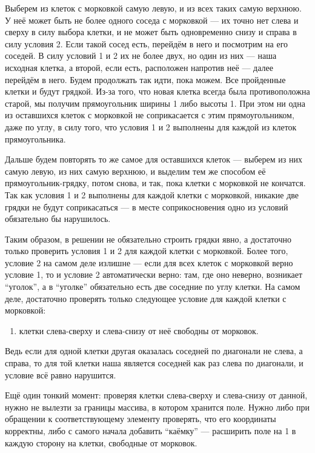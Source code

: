 \documentclass[12pt]{article}
\theoremstyle{definition}
\begin{document}
Выберем из клеток с морковкой самую левую, и из всех таких самую верхнюю. У неё может быть не более одного соседа с морковкой --- их точно нет слева и сверху в силу выбора клетки,
и не может быть одновременно снизу и справа в силу условия 2. Если такой сосед есть, перейдём в него и посмотрим на его соседей. В силу условий 1 и 2 их не более двух, но один из них ---
наша исходная клетка, а второй, если есть, расположен напротив неё --- далее перейдём в него. Будем продолжать так идти, пока можем. Все пройденные клетки и будут грядкой.
Из-за того, что новая клетка всегда была противоположна старой, мы получим прямоугольник ширины 1 либо высоты 1. При этом ни одна из оставшихся клеток с морковкой не соприкасается с этим прямоугольником, даже по углу, в силу того,
что условия 1 и 2 выполнены для каждой из клеток прямоугольника.

Дальше будем повторять то же самое для оставшихся клеток --- выберем из них самую левую, из них самую верхнюю, и выделим тем же способом её прямоугольник-грядку, потом снова, и так,
пока клетки с морковкой не кончатся. Так как условия 1 и 2 выполнены для каждой клетки с морковкой, никакие две грядки не будут соприкасаться --- в месте соприкосновения одно из условий
обязательно бы нарушилось.

Таким образом, в решении не обязательно строить грядки явно, а достаточно только проверить условия 1 и 2 для каждой клетки с морковкой. Более того, условие 2 на самом деле излишне ---
если для всех клеток с морковкой верно условие 1, то и условие 2 автоматически верно: там, где оно неверно, возникает ``уголок'', а в ``уголке'' обязательно есть две соседние по углу клетки. На самом деле, достаточно проверять только следующее условие для каждой клетки с морковкой:
\begin{enumerate}
    \item клетки слева-сверху и слева-снизу от неё свободны от морковок.
\end{enumerate}
Ведь если для одной клетки другая оказалась соседней по диагонали не слева, а справа, то для той клетки наша является соседней как раз слева по диагонали, и условие всё равно нарушится.

Ещё один тонкий момент: проверяя клетки слева-сверху и слева-снизу от данной, нужно не вылезти за границы массива, в котором хранится поле. Нужно либо при обращении к соответствующему
элементу проверять, что его координаты корректны, либо с самого начала добавить ``каёмку'' --- расширить поле на 1 в каждую сторону на клетки, свободные от морковок.
\end{document}
